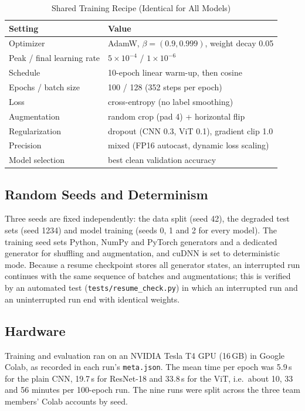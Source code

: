 \documentclass[conference]{IEEEtran}
\begin{document}
\begin{table}[!t]
\caption{Shared Training Recipe (Identical for All Models)}
\label{tab:hparams}
\centering
\footnotesize
\renewcommand{\arraystretch}{1.1}
\begin{tabular}{@{}ll@{}}
\toprule
\textbf{Setting} & \textbf{Value} \\
\midrule
Optimizer & AdamW, $\beta = (0.9, 0.999)$, weight decay 0.05 \\
Peak / final learning rate & $5\times10^{-4}$ / $1\times10^{-6}$ \\
Schedule & 10-epoch linear warm-up, then cosine \\
Epochs / batch size & 100 / 128 (352 steps per epoch) \\
Loss & cross-entropy (no label smoothing) \\
Augmentation & random crop (pad 4) + horizontal flip \\
Regularization & dropout (CNN 0.3, ViT 0.1), gradient clip 1.0 \\
Precision & mixed (FP16 autocast, dynamic loss scaling) \\
Model selection & best clean validation accuracy \\
\bottomrule
\end{tabular}
\end{table}

\subsection{Random Seeds and Determinism}
Three seeds are fixed independently: the data split (seed 42), the degraded test sets (seed 1234) and model training (seeds 0, 1 and 2 for every model). The training seed sets Python, NumPy and PyTorch generators and a dedicated generator for shuffling and augmentation, and cuDNN is set to deterministic mode. Because a resume checkpoint stores all generator states, an interrupted run continues with the same sequence of batches and augmentations; this is verified by an automated test (\texttt{tests/resume\_check.py}) in which an interrupted run and an uninterrupted run end with identical weights.

\subsection{Hardware}
Training and evaluation ran on an NVIDIA Tesla T4 GPU (16\,GB) in Google Colab, as recorded in each run's \texttt{meta.json}. The mean time per epoch was 5.9\,s for the plain CNN, 19.7\,s for ResNet-18 and 33.8\,s for the ViT, i.e.\ about 10, 33 and 56 minutes per 100-epoch run. The nine runs were split across the three team members' Colab accounts by seed.
\end{document}
